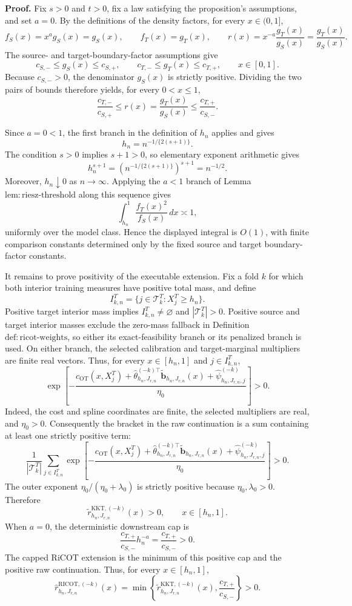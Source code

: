 \textbf{Proof.}
Fix \(s>0\) and \(t>0\), fix a law satisfying the proposition's assumptions, and set \(a=0\). By the definitions of the density factors, for every \(x\in(0,1]\),
\[
f_S(x)=x^a g_S(x)=g_S(x),
\qquad
f_T(x)=g_T(x),
\qquad
r(x)=x^{-a}\frac{g_T(x)}{g_S(x)}=\frac{g_T(x)}{g_S(x)}.
\]
The source- and target-boundary-factor assumptions give
\[
c_{S,-}\le g_S(x)\le c_{S,+},
\qquad
c_{T,-}\le g_T(x)\le c_{T,+},
\qquad x\in[0,1].
\]
Because \(c_{S,-}>0\), the denominator \(g_S(x)\) is strictly positive. Dividing the two pairs of bounds therefore yields, for every \(0<x\le1\),
\[
\frac{c_{T,-}}{c_{S,+}}
\le r(x)=\frac{g_T(x)}{g_S(x)}
\le \frac{c_{T,+}}{c_{S,-}}.
\]

Since \(a=0<1\), the first branch in the definition of \(h_n\) applies and gives
\[
h_n=n^{-1/\{2(s+1)\}}.
\]
The condition \(s>0\) implies \(s+1>0\), so elementary exponent arithmetic gives
\[
h_n^{s+1}
=\left(n^{-1/\{2(s+1)\}}\right)^{s+1}
=n^{-1/2}.
\]
Moreover, \(h_n\downarrow0\) as \(n\to\infty\). Applying the \(a<1\) branch of Lemma \(\mathrm{lem:riesz\text{-}threshold}\) along this sequence gives
\[
\int_{h_n}^1\frac{f_T(x)^2}{f_S(x)}\,dx\asymp1,
\]
uniformly over the model class. Hence the displayed integral is \(O(1)\), with finite comparison constants determined only by the fixed source and target boundary-factor constants.

It remains to prove positivity of the executable extension. Fix a fold \(k\) for which both interior training measures have positive total mass, and define
\[
I^T_{k,n}=\{j\in\mathcal T^T_k:X_j^T\ge h_n\}.
\]
Positive target interior mass implies \(I^T_{k,n}\ne\varnothing\) and \(|\mathcal T^T_k|>0\). Positive source and target interior masses exclude the zero-mass fallback in Definition \(\mathrm{def:ricot\text{-}weights}\), so either its exact-feasibility branch or its penalized branch is used. On either branch, the selected calibration and target-marginal multipliers are finite real vectors. Thus, for every \(x\in[h_n,1]\) and \(j\in I^T_{k,n}\),
\[
\exp\!\left[-\frac{c_{\mathrm{OT}}(x,X_j^T)
+\widehat\theta_{h_n,J_{r,n}}^{(-k)\top}
\widetilde{\mathbf b}_{h_n,J_{r,n}}(x)
+\widehat\psi^{(-k)}_{h_n,J_{r,n},j}}{\eta_0}\right]>0.
\]
Indeed, the cost and spline coordinates are finite, the selected multipliers are real, and \(\eta_0>0\). Consequently the bracket in the raw continuation is a sum containing at least one strictly positive term:
\[
\frac{1}{|\mathcal T^T_k|}
\sum_{j\in I^T_{k,n}}
\exp\!\left[-\frac{c_{\mathrm{OT}}(x,X_j^T)
+\widehat\theta_{h_n,J_{r,n}}^{(-k)\top}
\widetilde{\mathbf b}_{h_n,J_{r,n}}(x)
+\widehat\psi^{(-k)}_{h_n,J_{r,n},j}}{\eta_0}\right]>0.
\]
The outer exponent \(\eta_0/(\eta_0+\lambda_0)\) is strictly positive because \(\eta_0,\lambda_0>0\). Therefore
\[
\widetilde r^{\mathrm{KKT},(-k)}_{h_n,J_{r,n}}(x)>0,
\qquad x\in[h_n,1].
\]
When \(a=0\), the deterministic downstream cap is
\[
\frac{c_{T,+}}{c_{S,-}}h_n^{-a}=\frac{c_{T,+}}{c_{S,-}}>0.
\]
The capped RiCOT extension is the minimum of this positive cap and the positive raw continuation. Thus, for every \(x\in[h_n,1]\),
\[
\widehat r^{\mathrm{RICOT},(-k)}_{h_n,J_{r,n}}(x)
=\min\!\left\{
\widetilde r^{\mathrm{KKT},(-k)}_{h_n,J_{r,n}}(x),
\frac{c_{T,+}}{c_{S,-}}
\right\}>0.
\]

